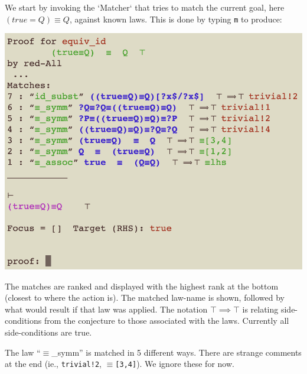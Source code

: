 \documentclass[11pt]{article}
\begin{document}
We start by invoking the `Matcher` that tries to match the current
goal, here $(true=Q)\equiv Q$, against known laws.
This is done by typing \verb"m" to produce:

\includegraphics[scale=0.75]{doc/images/1-m.png}

The matches are ranked and displayed with the highest rank at the bottom
(closest to where the action is).
The matched law-name is shown, followed by what would result if that law was
applied. The notation $\top \implies \top$ is relating side-conditions from
the conjecture to those associated with the laws. 
Currently all side-conditions are true.

The law ``$\equiv$\_symm'' is matched in 5 different ways.
There are strange comments at the end 
(ie., {\color{red}\texttt{trivial!2}}, {\color{green!50!black}$\equiv$\texttt{[3,4]}}).
We ignore these for now.








\end{document}
